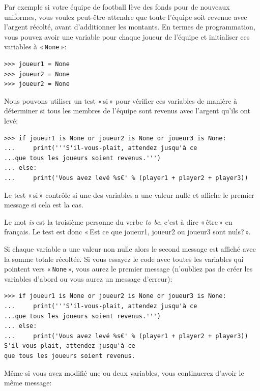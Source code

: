 Par exemple si votre équipe de football lève des fonds pour de nouveaux uniformes, vous voulez peut-être attendre que toute l'équipe soit revenue avec l'argent récolté, avant d'ad\-di\-tion\-ner les montants. En termes de programmation, vous pouvez avoir une variable pour chaque joueur de l'équipe et initialiser ces variables à « \texttt{None} »:

\begin{Verbatim}[frame=single,rulecolor=\color{mbleu}, label=à taper]
>>> joueur1 = None
>>> joueur2 = None
>>> joueur2 = None
\end{Verbatim}

Nous pouvons utiliser un test « si » pour vérifier ces variables de manière à déterminer si tous les membres de l'équipe sont revenus avec l'argent qu'ils ont levé:

\begin{Verbatim}[frame=single,rulecolor=\color{green}, label=à taper avec attention]
>>> if joueur1 is None or joueur2 is None or joueur3 is None:
...     print('''S'il-vous-plait, attendez jusqu'à ce 
...que tous les joueurs soient revenus.''')
... else:
...     print('Vous avez levé %s€' % (player1 + player2 + player3))
\end{Verbatim}

Le test « si » contrôle si une des variables a une valeur nulle et affiche le premier message si cela est la cas.

Le mot \emph{is} est la troisième personne du verbe \emph{to be}, c'est à dire « être » en français. Le test est donc « Est ce que joueur1, joueur2 ou joueur3 sont nuls? ». 

Si chaque variable a une valeur non nulle alors le second message est affiché avec la somme totale récoltée.
Si vous essayez le code avec toutes les variables qui pointent vers « \texttt{None} »,  vous aurez le premier message (n'oubliez pas de créer les variables d'abord ou vous aurez un message d'erreur):

\begin{Verbatim}[frame=single,rulecolor=\color{green}, label=à taper avec attention]
>>> if joueur1 is None or joueur2 is None or joueur3 is None:
...     print('''S'il-vous-plait, attendez jusqu'à ce 
...que tous les joueurs soient revenus.''')
... else:
...     print('Vous avez levé %s€' % (player1 + player2 + player3))
S'il-vous-plait, attendez jusqu'à ce 
que tous les joueurs soient revenus.
\end{Verbatim}

Même si vous avez modifié une ou deux variables, vous continuerez d'avoir le même message:

